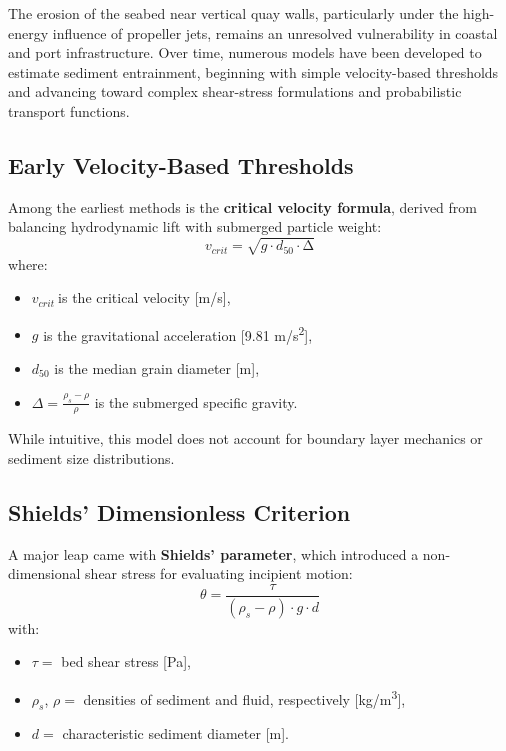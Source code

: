 \documentclass[Journal,letterpaper]{ascelike-new}
\begin{document}
The erosion of the seabed near vertical quay walls, particularly under the high-energy influence of propeller jets, remains an unresolved vulnerability in coastal and port infrastructure. Over time, numerous models have been developed to estimate sediment entrainment, beginning with simple velocity-based thresholds and advancing toward complex shear-stress formulations and probabilistic transport functions.


\subsection{Early Velocity-Based Thresholds}

Among the earliest methods is the \textbf{critical velocity formula}, derived from balancing hydrodynamic lift with submerged particle weight:
\[v_{crit}=\sqrt{g\cdot d_{50}\cdot \mathrm{\Delta }}\]
where:
\begin{itemize}
\item  $v_{crit}\ $is the critical velocity [m/s],

\item  $g$ is the gravitational acceleration [9.81 m/s\textsuperscript{2}],

\item  $d_{50}$ is the median grain diameter [m],

\item  $\Delta =\frac{{\rho }_s-\rho }{\rho }$ is the submerged specific gravity.
\end{itemize}

While intuitive, this model does not account for boundary layer mechanics or sediment size distributions.


\subsection{Shields' Dimensionless Criterion \protect\citeyear{shields1936}}

A major leap came with \textbf{Shields' parameter}, which introduced a non-dimensional shear stress for evaluating incipient motion:
\[\theta =\frac{\tau }{({\rho }_s-\rho )\cdot g\cdot d}\]
with:
\begin{itemize}
\item  $\tau =$ bed shear stress [Pa],

\item  ${\rho }_s$, $\rho =$ densities of sediment and fluid, respectively [kg/m\textsuperscript{3}],

\item  $d=$ characteristic sediment diameter [m].
\end{itemize}
\end{document}
